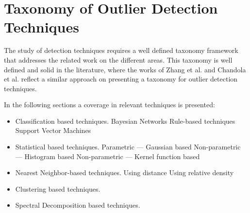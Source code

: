 

\newpage

\section{Taxonomy of Outlier Detection Techniques}

The study of detection techniques requires a well defined taxonomy framework that addresses the related work on the different areas. This taxonomy is well defined and solid in the literature, where the works of Zhang et al. and Chandola et al. reflect a similar approach on presenting a taxonomy for outlier detection techniques.

In the following sections a coverage in relevant techniques is presented:

\begin{itemize}
	\setlength\itemsep{-0.5em}
	\item Classification based techniques.
	\subitem Bayesian Networks
	\subitem Rule-based techniques
	\subitem Support Vector Machines
	
	\item Statistical based techniques.
	\subitem Parametric --- Gaussian based
	\subitem Non-parametric --- Histogram based
	\subitem Non-parametric --- Kernel function based
	
	\item Nearest Neighbor-based techniques.
	\subitem Using distance
	\subitem Using relative density
	
	\item Clustering based techniques.
	
	\item Spectral Decomposition based techniques.
	
\end{itemize}












